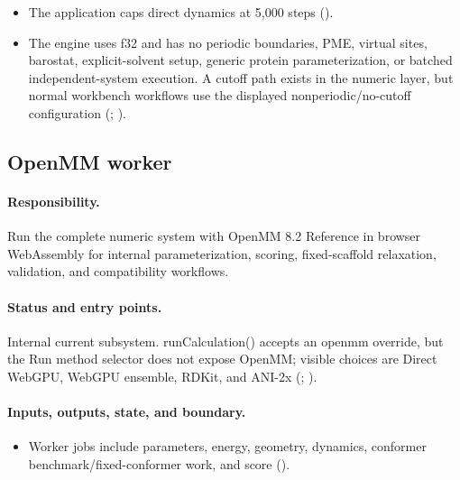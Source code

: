 \documentclass[11pt]{article}
\begin{document}
\begin{small}
\begin{itemize}[leftmargin=*]
\item The application caps direct dynamics at 5,000 steps ().

\item The engine uses f32 and has no periodic boundaries, PME, virtual sites, barostat, explicit-solvent setup, generic protein parameterization, or batched independent-system execution. A cutoff path exists in the numeric layer, but normal workbench workflows use the displayed nonperiodic/no-cutoff configuration (; ).

\end{itemize}

\subsection{OpenMM worker}\label{appB:sec12}

\paragraph{Responsibility.}

Run the complete numeric system with OpenMM 8.2 Reference in browser WebAssembly for internal parameterization, scoring, fixed-scaffold relaxation, validation, and compatibility workflows.

\paragraph{Status and entry points.}

Internal current subsystem. runCalculation() accepts an openmm override, but the Run method selector does not expose OpenMM; visible choices are Direct WebGPU, WebGPU ensemble, RDKit, and ANI-2x (; ).

\paragraph{Inputs, outputs, state, and boundary.}

\begin{itemize}[leftmargin=*]

\item Worker jobs include parameters, energy, geometry, dynamics, conformer benchmark/fixed-conformer work, and score ().

\end{itemize}


\end{small}
\end{document}
